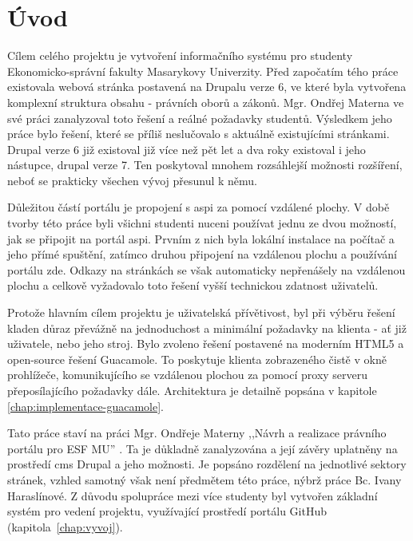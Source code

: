 \chapter{Úvod}
Cílem celého projektu je vytvoření informačního systému pro studenty Ekonomicko-správní fakulty Masarykovy Univerzity. Před započatím tého práce existovala webová stránka postavená na Drupalu verze 6, ve které byla vytvořena komplexní struktura obsahu - právních oborů a zákonů. Mgr. Ondřej Materna ve své práci zanalyzoval toto řešení a reálné požadavky studentů. Výsledkem jeho práce bylo řešení, které se příliš neslučovalo s aktuálně existujícími stránkami. Drupal verze 6 již existoval již více než pět let a dva roky existoval i jeho nástupce, drupal verze 7\cite{website:wiki:drupal}. Ten poskytoval mnohem rozsáhlejší možnosti rozšíření, neboť se prakticky všechen vývoj přesunul k němu. 

Důležitou částí portálu je propojení s \gls{aspi} za pomocí vzdálené plochy. V době tvorby této práce byli všichni studenti nuceni používat jednu ze dvou možností, jak se připojit na portál \gls{aspi}. Prvním z nich byla lokální instalace na počítač a jeho přímé spuštění, zatímco druhou připojení na vzdálenou plochu a používání portálu zde. Odkazy na stránkách se však automaticky nepřenášely na vzdálenou plochu a celkově vyžadovalo toto řešení vyšší technickou zdatnost uživatelů.

Protože hlavním cílem projektu je uživatelská přívětivost, byl při výběru řešení kladen důraz převážně na jednoduchost a minimální požadavky na klienta - ať již uživatele, nebo jeho stroj. Bylo zvoleno řešení postavené na moderním HTML5 a open-source řešení Guacamole. To poskytuje klienta zobrazeného čistě v okně prohlížeče, komunikujícího se vzdálenou plochou za pomocí proxy serveru přeposílajícího požadavky dále. Architektura je detailně popsána v kapitole \ref{chap:implementace-guacamole}.

Tato práce staví na práci Mgr. Ondřeje Materny ,,Návrh a realizace právního portálu pro ESF MU'' \cite{omaterna2013}. Ta je důkladně zanalyzována a její závěry uplatněny na prostředí \gls{cms} Drupal a jeho možnosti. Je popsáno rozdělení na jednotlivé sektory stránek, vzhled samotný však není předmětem této práce, nýbrž práce Bc. Ivany Haraslínové. Z důvodu spolupráce mezi více studenty byl vytvořen základní systém pro vedení projektu, využívající prostředí portálu GitHub (kapitola~\ref{chap:vyvoj}).

